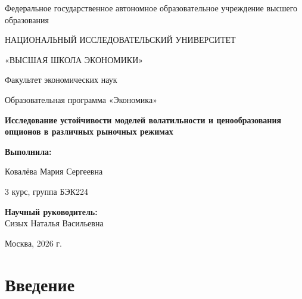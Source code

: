 \documentclass[11pt,a4paper]{article}
\begin{document}
\begin{titlepage}

\centering

{\large Федеральное государственное автономное образовательное учреждение высшего образования\par}

{\large НАЦИОНАЛЬНЫЙ ИССЛЕДОВАТЕЛЬСКИЙ УНИВЕРСИТЕТ\par}

{\large «ВЫСШАЯ ШКОЛА ЭКОНОМИКИ»\par}

{\large Факультет экономических наук\par}

{\large Образовательная программа «Экономика»\par}

\vfill

{\Large\bfseries
Исследование устойчивости моделей волатильности и ценообразования опционов в различных рыночных режимах
\par}

\vfill

\begin{flushright}
\textbf{Выполнила:}
\end{flushright}

\begin{flushright}
Ковалёва Мария Сергеевна
\end{flushright}

\begin{flushright}
3 курс, группа БЭК224
\end{flushright}

\vspace{1cm}

\begin{flushright}
\textbf{Научный руководитель:}\\
Сизых Наталья Васильевна\\[0.5cm]
\underline{\hspace{5cm}}
\end{flushright}

\vfill

{\large Москва, 2026 г.\par}

\end{titlepage}

\tableofcontents

\newpage

\section{Введение}
\end{document}
